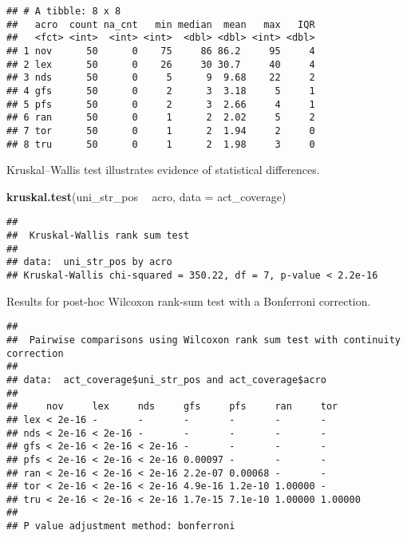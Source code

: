 \documentclass[]{book}
\newenvironment{Shaded}{\begin{snugshade}}{\end{snugshade}}
\newcommand{\DataTypeTok}[1]{\textcolor[rgb]{0.13,0.29,0.53}{#1}}
\newcommand{\KeywordTok}[1]{\textcolor[rgb]{0.13,0.29,0.53}{\textbf{#1}}}
\newcommand{\NormalTok}[1]{#1}
\newcommand{\OperatorTok}[1]{\textcolor[rgb]{0.81,0.36,0.00}{\textbf{#1}}}
\newcommand{\OtherTok}[1]{\textcolor[rgb]{0.56,0.35,0.01}{#1}}
\newcommand{\StringTok}[1]{\textcolor[rgb]{0.31,0.60,0.02}{#1}}
\begin{document}
\begin{verbatim}
## # A tibble: 8 x 8
##   acro  count na_cnt   min median  mean   max   IQR
##   <fct> <int>  <int> <int>  <dbl> <dbl> <int> <dbl>
## 1 nov      50      0    75     86 86.2     95     4
## 2 lex      50      0    26     30 30.7     40     4
## 3 nds      50      0     5      9  9.68    22     2
## 4 gfs      50      0     2      3  3.18     5     1
## 5 pfs      50      0     2      3  2.66     4     1
## 6 ran      50      0     1      2  2.02     5     2
## 7 tor      50      0     1      2  1.94     2     0
## 8 tru      50      0     1      2  1.98     3     0
\end{verbatim}

Kruskal--Wallis test illustrates evidence of statistical differences.

\begin{Shaded}
\begin{Highlighting}[]
\KeywordTok{kruskal.test}\NormalTok{(uni_str_pos }\OperatorTok{~}\StringTok{ }\NormalTok{acro, }\DataTypeTok{data =}\NormalTok{ act_coverage)}
\end{Highlighting}
\end{Shaded}

\begin{verbatim}
## 
##  Kruskal-Wallis rank sum test
## 
## data:  uni_str_pos by acro
## Kruskal-Wallis chi-squared = 350.22, df = 7, p-value < 2.2e-16
\end{verbatim}

Results for post-hoc Wilcoxon rank-sum test with a Bonferroni correction.

\begin{Shaded}
\end{Shaded}

\begin{verbatim}
## 
##  Pairwise comparisons using Wilcoxon rank sum test with continuity correction 
## 
## data:  act_coverage$uni_str_pos and act_coverage$acro 
## 
##     nov     lex     nds     gfs     pfs     ran     tor    
## lex < 2e-16 -       -       -       -       -       -      
## nds < 2e-16 < 2e-16 -       -       -       -       -      
## gfs < 2e-16 < 2e-16 < 2e-16 -       -       -       -      
## pfs < 2e-16 < 2e-16 < 2e-16 0.00097 -       -       -      
## ran < 2e-16 < 2e-16 < 2e-16 2.2e-07 0.00068 -       -      
## tor < 2e-16 < 2e-16 < 2e-16 4.9e-16 1.2e-10 1.00000 -      
## tru < 2e-16 < 2e-16 < 2e-16 1.7e-15 7.1e-10 1.00000 1.00000
## 
## P value adjustment method: bonferroni
\end{verbatim}
\end{document}
